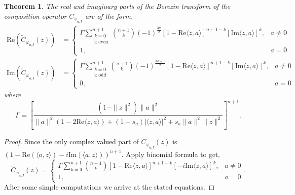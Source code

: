 \documentclass{amsart}
\newtheorem{theorem}{Theorem}
\theoremstyle{remark}
\begin{document}
\begin{theorem}\label{RealImaginary}
    The real and imaginary parts of the Berezin transform of the composition operator $C_{\varphi_{a,I}}$ are of the form,
    \begin{align*}
        \mathrm{Re}( \widetilde{C}_{\varphi_{a,I}}(z)) &=
        \begin{cases}
         \Gamma 
        \displaystyle\sum_{\substack{k=0 \\ \mathrm{k\text{ even}}}}^{n+1} {n + 1 \choose k} (-1)^{\frac{3k}{2}}[1 - \mathrm{Re}\langle z,a \rangle]^{n+1-k}  [\mathrm{Im}\langle z,a \rangle]^{k}, & a \neq 0\\
        1, & a = 0   
        \end{cases}
        \\
        \mathrm{Im}( \widetilde{C}_{\varphi_{a,I}}(z)) &=
        \begin{cases}
        \Gamma
        \displaystyle\sum_{\substack{k=0 \\ \mathrm{k\text{ odd}}}}^{n+1} {n + 1 \choose k} (-1)^{\frac{3k-1}{2}}[1 - \mathrm{Re}\langle z,a \rangle]^{n+1-k}  [\mathrm{Im}\langle z,a \rangle]^{k}, & a \neq 0\\
        0, & a = 0    
        \end{cases}     
    \end{align*}
     where
  \[\Gamma = \left[\frac{(1 - \|z\|^{2})\|a\|^{2}}{\|a\|^{2}(1-2\mathrm{Re}\langle z,a \rangle) + (1 - s_{a})|\langle z,a \rangle|^2 + s_{a}\|a\|^2\|z\|^2}\right]^{n+1}.\]
\end{theorem}
\begin{proof}
    Since the only complex valued part of $\widetilde{C}_{\varphi_{a,I}}(z)$ is $(1 - \mathrm{Re}(\langle a,z \rangle) - i\mathrm{Im}(\langle a,z \rangle))^{n+1}$. 
    Apply binomial formula to get,
    \begin{equation*}
        \widetilde{C}_{\varphi_{a,I}}(z) =
        \begin{cases}
        \Gamma \displaystyle\sum_{k=0}^{n+1} {n + 1 \choose k}[1 - \mathrm{Re}\langle z,a \rangle]^{n+1-k}  [-i\mathrm{Im}\langle z,a \rangle]^{k}, & a \neq 0\\
        1, & a = 0   
        \end{cases}
        .
    \end{equation*}
    After some simple computations we arrive at the stated equations.
\end{proof}
\end{document}

